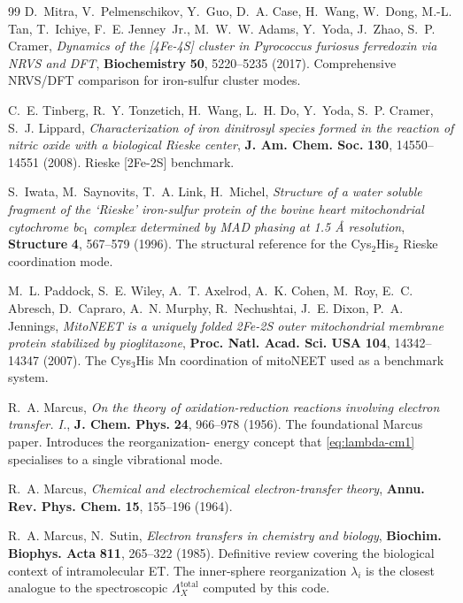 \documentclass[10pt,a4paper,twoside]{article}
\begin{document}
\begin{thebibliography}{99}
D.~Mitra, V.~Pelmenschikov, Y.~Guo, D.~A. Case, H.~Wang, W.~Dong,
M.-L. Tan, T.~Ichiye, F.~E. Jenney~Jr., M.~W.~W. Adams, Y.~Yoda,
J.~Zhao, S.~P. Cramer,
\emph{Dynamics of the [4Fe-4S] cluster in {\em Pyrococcus furiosus}
ferredoxin via NRVS and DFT},
\textbf{Biochemistry} \textbf{50}, 5220--5235 (2017).
Comprehensive NRVS/DFT comparison for iron-sulfur cluster modes.

C.~E. Tinberg, R.~Y. Tonzetich, H.~Wang, L.~H. Do, Y.~Yoda,
S.~P. Cramer, S.~J. Lippard,
\emph{Characterization of iron dinitrosyl species formed in the
reaction of nitric oxide with a biological Rieske center},
\textbf{J. Am. Chem. Soc.} \textbf{130}, 14550--14551 (2008).
Rieske [2Fe-2S] benchmark.

S.~Iwata, M.~Saynovits, T.~A. Link, H.~Michel,
\emph{Structure of a water soluble fragment of the {`Rieske'}
iron-sulfur protein of the bovine heart mitochondrial cytochrome
bc$_1$ complex determined by {MAD} phasing at 1.5 \AA{} resolution},
\textbf{Structure} \textbf{4}, 567--579 (1996).
The structural reference for the Cys$_2$His$_2$ Rieske coordination
mode.

M.~L. Paddock, S.~E. Wiley, A.~T. Axelrod, A.~K. Cohen, M.~Roy,
E.~C. Abresch, D.~Capraro, A.~N. Murphy, R.~Nechushtai,
J.~E. Dixon, P.~A. Jennings,
\emph{MitoNEET is a uniquely folded 2Fe-2S outer mitochondrial
membrane protein stabilized by pioglitazone},
\textbf{Proc. Natl. Acad. Sci. USA} \textbf{104}, 14342--14347 (2007).
The Cys$_3$His Mn coordination of mitoNEET used as a benchmark
system.

R.~A. Marcus,
\emph{On the theory of oxidation-reduction reactions involving
electron transfer. I.},
\textbf{J. Chem. Phys.} \textbf{24}, 966--978 (1956).
The foundational Marcus paper. Introduces the reorganization-
energy concept that \cref{eq:lambda-cm1} specialises to a single
vibrational mode.

R.~A. Marcus,
\emph{Chemical and electrochemical electron-transfer theory},
\textbf{Annu. Rev. Phys. Chem.} \textbf{15}, 155--196 (1964).

R.~A. Marcus, N.~Sutin,
\emph{Electron transfers in chemistry and biology},
\textbf{Biochim. Biophys. Acta} \textbf{811}, 265--322 (1985).
Definitive review covering the biological context of intramolecular
ET. The inner-sphere reorganization $\lambda_i$ is the closest
analogue to the spectroscopic
$\Lambda_X^\text{total}$ computed by this code.


\end{thebibliography}
\end{document}
